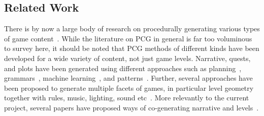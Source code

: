 \subsection{Related Work}


    
    
    

There is by now a large body of research on procedurally generating various types of game content~. While the literature on PCG in general is far too voluminous to survey here, it should be noted that PCG methods of different kinds have been developed for a wide variety of content, not just game levels. Narrative, quests, and plots have been generated using different approaches such as planning~, grammars~, machine learning~, and patterns~. Further, several approaches have been proposed to generate multiple facets of games, in particular level geometry together with rules, music, lighting, sound etc~. More relevantly to the current project, several papers have proposed ways of co-generating narrative and levels~.

